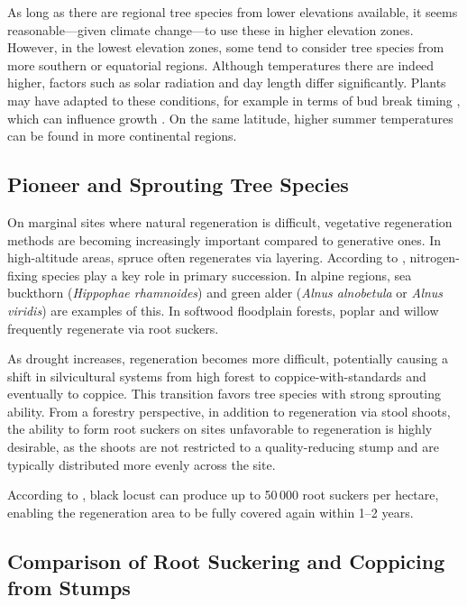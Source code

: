 As long as there are regional tree species from lower elevations available, it seems reasonable—given climate change—to use these in higher elevation zones. However, in the lowest elevation zones, some tend to consider tree species from more southern or equatorial regions. Although temperatures there are indeed higher, factors such as solar radiation and day length differ significantly. Plants may have adapted to these conditions, for example in terms of bud break timing \citep{phillips1941tageslaenge}, which can influence growth \citep{jester1939zuwachsUndTageslaenge}. On the same latitude, higher summer temperatures can be found in more continental regions.


\subsection{Pioneer and Sprouting Tree Species}

On marginal sites where natural regeneration is difficult, vegetative regeneration methods are becoming increasingly important compared to generative ones. In high-altitude areas, spruce often regenerates via layering. According to \citet{boring1984robinie}, nitrogen-fixing species play a key role in primary succession. In alpine regions, sea buckthorn (\emph{Hippophae rhamnoides}) and green alder (\emph{Alnus alnobetula} or \emph{Alnus viridis}) are examples of this. In softwood floodplain forests, poplar and willow frequently regenerate via root suckers.

As drought increases, regeneration becomes more difficult, potentially causing a shift in silvicultural systems from high forest to coppice-with-standards and eventually to coppice. This transition favors tree species with strong sprouting ability. From a forestry perspective, in addition to regeneration via stool shoots, the ability to form root suckers on sites unfavorable to regeneration is highly desirable, as the shoots are not restricted to a quality-reducing stump and are typically distributed more evenly across the site.

According to \citet{nicolescu2019robinie}, black locust can produce up to 50\,000 root suckers per hectare, enabling the regeneration area to be fully covered again within 1–2 years.

\subsection{Comparison of Root Suckering and Coppicing from Stumps}


